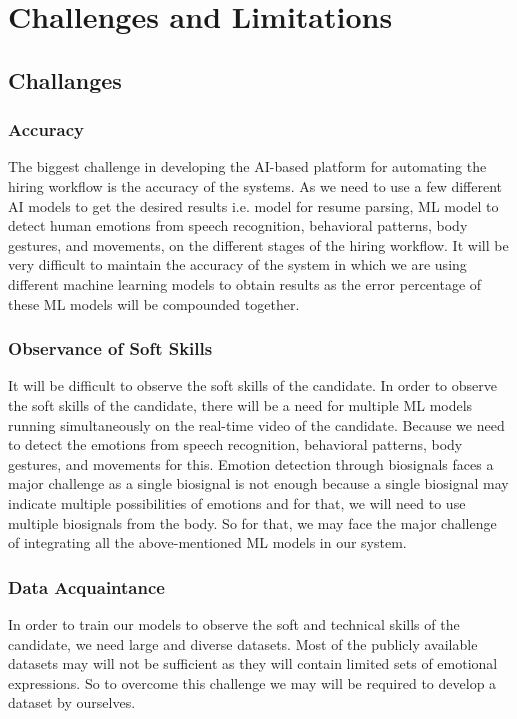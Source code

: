 \section{Challenges and Limitations}
\subsection{Challanges}
\subsubsection{Accuracy}
The biggest challenge in developing the AI-based platform for automating the hiring workflow is the accuracy of the systems. As we need to use a few different AI models to get the desired results i.e. model for resume parsing, ML model to detect human emotions from speech recognition, behavioral patterns, body gestures, and movements, on the different stages of the hiring workflow. It will be very difficult to maintain the accuracy of the system in which we are using different machine learning models to obtain results as the error percentage of these ML models will be compounded together.

\subsubsection{Observance of Soft Skills}
It will be difficult to observe the soft skills of the candidate. In order to observe the soft skills of the candidate, there will be a need for multiple ML models running simultaneously on the real-time video of the candidate. Because we need to detect the emotions from speech recognition, behavioral patterns, body gestures, and movements for this. Emotion detection through biosignals faces a major challenge as a single biosignal is not enough because a single biosignal may indicate multiple possibilities of emotions and for that, we will need to use multiple biosignals from the body. So for that, we may face the major challenge of integrating all the above-mentioned ML models in our system. 

\subsubsection{Data Acquaintance}
In order to train our models to observe the soft and technical skills of the candidate, we need large and diverse datasets. Most of the publicly available datasets may will not be sufficient as they will contain limited sets of emotional expressions\cite{hiringstatistics}. So to overcome this challenge we may will be required to develop a dataset by ourselves. 

